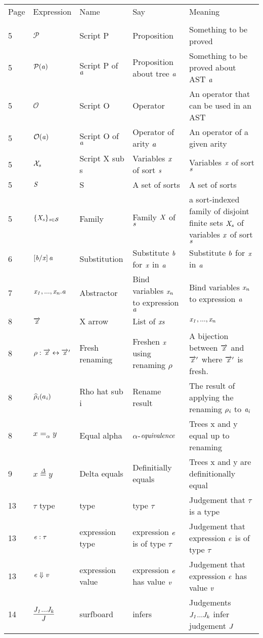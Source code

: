 \documentclass[12pt]{article}
\begin{document}
\begin{tabular}[b] {p{} p{} p{} p{} p{}}
Page & Expression & Name & Say & Meaning \\ \\
5& $\mathcal{P}$ & Script P & Proposition & Something to be proved \\
5& $\mathcal{P}(\it{a})$ & Script P of $\it{a}$ & Proposition about tree $\it{a}$ & Something to be proved about AST $\it{a}$ \\
5& $\mathcal{O}$ & Script O & Operator & An operator that can be used in an AST \\
5& $\mathcal{O}(\it{a})$ & Script O of $\it{a}$ & Operator of arity $\it{a}$ & An operator of a given arity \\
5& $\mathcal{X}_{\it{s}}$ & Script X sub s & Variables $\it{x}$ of sort $\it{s}$ & Variables $\it{x}$ of sort $\it{s}$ \\
5& $\it{S} $ & S & A set of sorts & A set of sorts \\
5& $ \{ \it{X}_{s} \} _{\it{s} \in \mathcal{S}}$  & Family & Family $ \it{X} $ of $\it{s}$ & a sort-indexed family of disjoint finite sets $ \it{X}_s $ of variables $\it{x}$ of sort $ \it{s} $\\
6& $\left[ \it{b} / \it{x}\right] \it{a}$ & Substitution & Substitute $\it{b}$ for $\it{x}$ in $\it{a}$ & Substitute  $\it{b}$ for $\it{x}$ in $\it{a}$ \\
7& $ \it{x}_1, ... ,\it{x}_{\it{n}}.\it{a} $ & Abstractor & Bind variables $\it{x_n}$ to expression $\it{a}$ & Bind variables $\it{x_n}$ to expression $\it{a}$ \\
8& $ \overrightarrow{\it{x}} $ & X arrow & List of $\it{x}s$ & $ \it{x}_1, ... ,\it{x}_{\it{n}} $ \\
8& $ \rho : \overrightarrow{\it{x}} \leftrightarrow \overrightarrow{\it{x}}'$ & Fresh renaming & Freshen $ \it{x} $ using renaming $ \rho $ & A bijection between $ \overrightarrow{\it{x}} $ and $ \overrightarrow{\it{x}}' $ where $ \overrightarrow{\it{x}}'$ is fresh. \\
8& $\widehat{\rho}_{\it{i}} (a_{\it{i}})$ & Rho hat sub i & Rename result & The result of applying the renaming $ \rho_ {\it{i}} $ to $ \it{a}_{\it{i}} $ \\
8& $x =_\alpha y$ & Equal alpha & $ \it{\alpha}$-$\it{equivalence} $ & Trees x and y equal up to renaming \\
9& $x \overset{\Delta}{=} y$ & Delta equals & Definitially equals & Trees x and y are definitionally equal \\
13& $\tau$ type& type & type $\tau$ & Judgement that $\tau$ is a type \\
13& $\it{e} : \tau$ & expression type & expression $\it{e}$ is of type $\tau$ & Judgement that expression $\it{e}$ is of type $\tau$ \\
13& $\it{e} \Downarrow \it{v}$ & expression value & expression $\it{e}$ has value $\it{v} $ & Judgement that expression $\it{e}$ has value $\it{v} $\\
14& $\infer {\it{J}} {\it{J}_{1}...\it{J}_{\it{k}}}$  & surfboard & infers & Judgements ${\it{J}_{1}...\it{J}_{\it{k}}}$ infer judgement ${\it{J}}$\\

\end{tabular}
\end{document}
